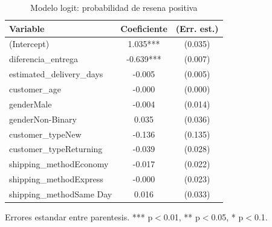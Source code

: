 \begin{table}[htbp]
\centering
\caption{Modelo logit: probabilidad de resena positiva}
\label{tab:logit}
\begin{tabular}{lcc}
\toprule
Variable & Coeficiente & (Err. est.) \\
\midrule
(Intercept) & 1.035*** & (0.035) \\
diferencia\_entrega & -0.639*** & (0.007) \\
estimated\_delivery\_days & -0.005 & (0.005) \\
customer\_age & -0.000 & (0.000) \\
genderMale & -0.004 & (0.014) \\
genderNon-Binary & 0.035 & (0.036) \\
customer\_typeNew & -0.136 & (0.135) \\
customer\_typeReturning & -0.039 & (0.028) \\
shipping\_methodEconomy & -0.017 & (0.022) \\
shipping\_methodExpress & -0.000 & (0.023) \\
shipping\_methodSame Day & 0.016 & (0.033) \\
\bottomrule
\end{tabular}
\begin{minipage}{0.9\textwidth}\footnotesize Errores estandar entre parentesis. *** p$<$0.01, ** p$<$0.05, * p$<$0.1. \end{minipage}
\end{table}
